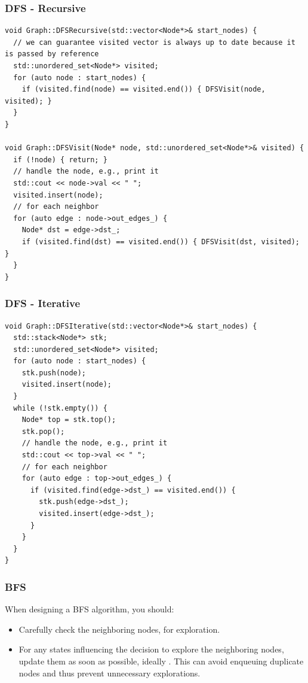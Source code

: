 \subsubsection{DFS - Recursive}
\begin{lstlisting}
void Graph::DFSRecursive(std::vector<Node*>& start_nodes) {
  // we can guarantee visited vector is always up to date because it is passed by reference
  std::unordered_set<Node*> visited;
  for (auto node : start_nodes) {
    if (visited.find(node) == visited.end()) { DFSVisit(node, visited); }
  }
}

void Graph::DFSVisit(Node* node, std::unordered_set<Node*>& visited) {
  if (!node) { return; }
  // handle the node, e.g., print it
  std::cout << node->val << " ";
  visited.insert(node);
  // for each neighbor
  for (auto edge : node->out_edges_) {
    Node* dst = edge->dst_;
    if (visited.find(dst) == visited.end()) { DFSVisit(dst, visited); }
  }
}
\end{lstlisting}

\subsubsection{DFS - Iterative}
\begin{lstlisting}
void Graph::DFSIterative(std::vector<Node*>& start_nodes) {
  std::stack<Node*> stk;
  std::unordered_set<Node*> visited;
  for (auto node : start_nodes) {
    stk.push(node);
    visited.insert(node);
  }
  while (!stk.empty()) {
    Node* top = stk.top();
    stk.pop();
    // handle the node, e.g., print it
    std::cout << top->val << " ";
    // for each neighbor
    for (auto edge : top->out_edges_) {
      if (visited.find(edge->dst_) == visited.end()) {
        stk.push(edge->dst_);
        visited.insert(edge->dst_);
      }
    }
  }
}
\end{lstlisting}
\subsubsection{BFS}\label{subsubsec:graph_universal_implementation_bfs}
\begin{tcolorbox}[title=\textbf{Takeaway}, width=1.0\linewidth,]
When designing a BFS algorithm, you should:
\begin{itemize}
\item Carefully check the neighboring nodes, {\color{blue}{only enqueue valid nodes}} for exploration.
\item For any states influencing the decision to explore the neighboring nodes, update them as soon as possible, ideally {\color{blue}{at the moment of its enqueuing}}. This can avoid enqueuing duplicate nodes and thus prevent unnecessary explorations.
\end{itemize}
\end{tcolorbox}

